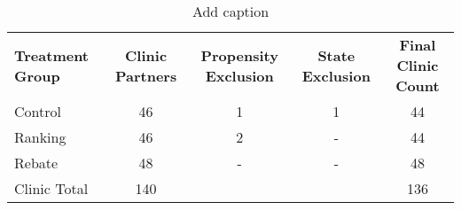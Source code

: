 \begin{table}[htbp]
  \centering
  \caption{Add caption}
    \begin{tabular}{lcccc}
    \textbf{Treatment Group} & \textbf{Clinic Partners} & \textbf{Propensity Exclusion} & \textbf{State Exclusion} & \textbf{Final Clinic Count} \\
    Control & 46    & 1     & 1     & 44 \\
    Ranking & 46    & 2     & -     & 44 \\
    Rebate & 48    & -     & -     & 48 \\
    Clinic Total & 140   &       &       & 136 \\
    \end{tabular}%
  \label{tab:addlabel}%
\end{table}%
